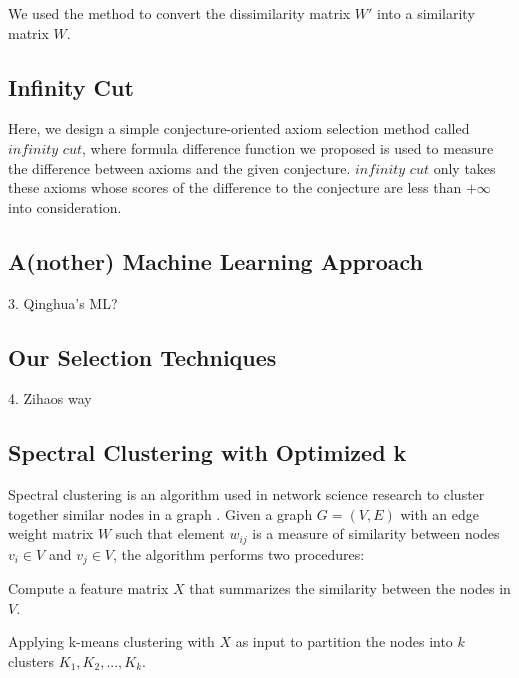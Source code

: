 \documentclass[EPiC]{easychair}
\newenvironment{packed_enumerate}{
\vspace*{-0.5em}
\begin{enumerate}
  \setlength{\partopsep}{0pt}
  \setlength{\itemsep}{1pt}
  \setlength{\parskip}{0pt}
  \setlength{\parsep}{0pt}
}{\end{enumerate}}
\begin{document}
We used the method to convert the dissimilarity matrix $W'$ into a similarity
matrix $W$. 

\subsection{Infinity Cut}
\label{QinghuaInf}

Here, we design a simple conjecture-oriented axiom selection method called 
$infinity$ $cut$, where formula difference function we proposed is used to 
measure the difference between axioms and the given conjecture. 
$infinity$ $cut$ only takes these axioms whose scores of the difference 
to the conjecture are less than $+\infty$ into consideration.

\subsection{A(nother) Machine Learning Approach}
\label{QinghuaML}

3. Qinghua's ML?
\subsection{Our Selection Techniques}
\label{Zihao}

4. Zihaos way
\subsection{Spectral Clustering with Optimized k}
\label{Zishi}

Spectral clustering is an algorithm used in network science research to
cluster together similar nodes in a graph \cite{vLu07}. 
Given a graph $G = (V, E)$ with an edge weight matrix $W$ such that element
$w_{ij}$ is a measure of similarity between nodes $v_{i} \in V$ and 
$v_{j} \in V$, the algorithm performs two procedures:
\begin{packed_enumerate}
\item Compute a feature matrix $X$ that summarizes the similarity between 
      the nodes in $V$.
\item Applying k-means clustering \cite{} with $X$ as input to partition the 
      nodes into $k$ clusters $K_{1}, K_{2}, ..., K_{k}$.
\end{packed_enumerate}
\end{document}
